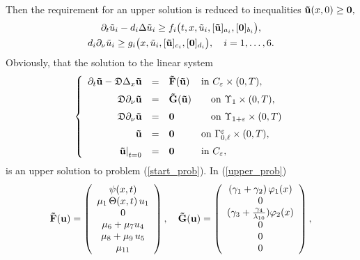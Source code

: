 \documentclass[reqno]{amsart}            %
\numberwithin{equation}{section}
\begin{document}
Then the requirement for an upper solution is reduced to inequalities ${\bf \tilde u}(x,0) \ge {\bf 0},$
\begin{gather*}
\partial_t \tilde{u}_i - d_i \Delta \tilde{u}_i \ge f_i\big(t,x,\tilde{u}_i, [{\bf\tilde{u}}]_{a_i}, [{\bf 0}]_{b_i}\big),
\\
 d_i \partial_{\nu} \tilde{u}_i \ge g_i\big(x,\tilde{u}_i, [{\bf \tilde{u}}]_{c_i}, [{\bf 0} ]_{d_i}\big), \quad i=1,\ldots,6.
\end{gather*}
Obviously, that the solution to the linear system
\begin{equation}\label{upper_prob}
\left\{
    \begin{array}{rcll}
    \partial_t {\bf \tilde u} - \mathfrak{D} \Delta_x {\bf \tilde u}  &=& {\bf \tilde F}({\bf \tilde u})
                    &\mbox{in} \ C_{\varepsilon}\times (0,T),
                    \\[2mm]
                    \mathfrak{D}  \partial_{\nu} {\bf \tilde u} &=&   {\bf \tilde{G}}({\bf \tilde u})
                    &\quad \mbox{on} \ \Upsilon_{1}\times (0,T),
                    \\[2mm]
 \mathfrak{D}  \partial_{\nu} {\bf\tilde u} &=&   {\bf 0}
                    &\quad \mbox{on} \ \Upsilon_{1+\varepsilon}\times (0,T)
                    \\[2mm]
   {\bf \tilde u} &=& {\bf 0}& \text{on} \  \Gamma^\varepsilon_{0, \ell}\times (0,T),
 \\[2mm]
    \left. {\bf \tilde u}\right|_{t=0} &=&{\bf 0} &\mbox{in} \   C_{\varepsilon},
   \end{array}\right.
\end{equation}
is an upper solution to problem (\ref{start_prob}). In (\ref{upper_prob})
$$
{\bf \tilde F}({\bf u}) = %
\left(
\begin{array}{c}
 \psi(x, t) %
\\%
\mu_1\, \Theta(x,t) \, u_1
\\%
 0 %
\\%
\mu_6  +  \mu_7  u_4   %
\\%
\mu_8 + \mu_9 \, u_5 %
\\%
 \mu_{11} %
\end{array}
\right),
\quad
{\bf \tilde G}({\bf u}) =
\left(
\begin{array}{c}
\left(\gamma_1  + \gamma_2\right)\varphi_1(x)
\\%
 0
\\%
(\gamma_3 + \frac{\gamma_4 }{\lambda_{10}} )\varphi_2(x)
\\%
 0
\\%
 0
\\%
 0
\end{array}
\right),
$$
\end{document}
